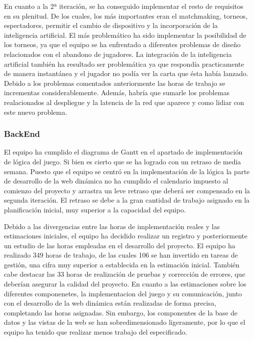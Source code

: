 En cuanto a la 2ª iteración, se ha conseguido implementar el resto de requisitos en su plenitud. De los cuales, los más importantes eran el matchmaking, torneos, espectadores, permitir el cambio de dispositivo y la incorporación de la inteligencia artificial. El más problemático ha sido implementar la posibilidad de los torneos, ya que el equipo se ha enfrentado a diferentes problemas de diseño relacionados con el abandono de jugadores. La integración de la inteligencia artificial también ha resultado ser problemática ya que respondía practicamente de manera instantánea y el jugador no podía ver la carta que ésta había lanzado.
\\
Debido a los problemas comentados anteriormente las horas de trabajo se incrementas considerablemente. Además, habría que sumarle los problemas realacionados al despliegue y la latencia de la red que aparece y como lidiar con este nuevo problema.

\subsubsection*{BackEnd}
El equipo ha cumplido el diagrama de Gantt en el apartado de implementación de lógica del juego. Si bien es cierto que se ha logrado con un retraso de media semana. Puesto que el equipo se centró en la implementación de la lógica la parte de desarrollo de la web dinámica no ha cumplido el calendario impuesto al comienzo del proyecto y arrastra un leve retraso que deberá ser compensado en la segunda iteración. El retraso se debe a la gran cantidad de trabajo asignado en la planificación inicial, muy superior a la capacidad del equipo.

Debido a las divergencias entre las horas de implementación reales y las estimaciones iniciales, el equipo ha decidido realizar un registro y posteriormente un estudio de las horas empleadas en el desarrollo del proyecto. El equipo ha realizado 349 horas de trabajo, de las cuales 106 se han invertido en tareas de gestión, una cifra muy superior a establecida en la estimación inicial. También cabe destacar las 33 horas de realización de pruebas y corrección de errores, que deberían asegurar la calidad del proyecto. En cuanto a las estimaciones sobre los diferentes componenetes, la implementacion del juego y su comunicación, junto con el desarrollo de la web dinámica están realizadas de forma precisa, completando las horas asignadas. Sin embargo, los componentes de la base de datos y las vistas de la web se han sobredimensionado ligeramente, por lo que el equipo ha tenido que realizar menos trabajo del especificado. 

